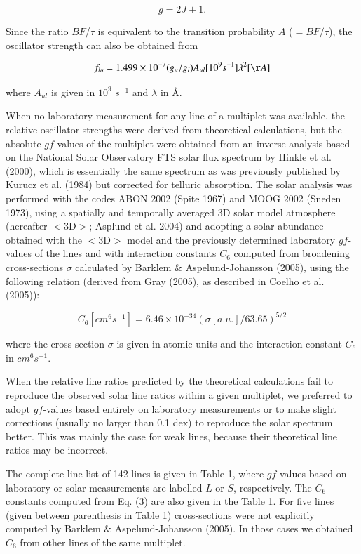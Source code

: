 \documentclass[traditabstract]{aa} %
\begin{document}
$$g = 2 J + 1.$$

\noindent Since the ratio $BF$/$\tau$ is equivalent to the transition probability $A$
($= BF/\tau$), the oscillator strength can also be obtained from

\begin{equation}
f_{lu} = 1.499 \times 10^{-7} (g_u/g_l) A_{ul}[10^9 s^{-1}] \lambda^2[\AA]
\end{equation}

\noindent where $A_{ul}$ is given in $10^9$ $s^{-1}$ and $\lambda$ in \AA.


When no laboratory measurement for any line of a multiplet was available,
the relative oscillator strengths were derived from theoretical
calculations, but the absolute $gf$-values of the multiplet were obtained 
from an inverse analysis based on the 
National Solar Observatory FTS solar flux spectrum by 
Hinkle et al. (2000), which is essentially the same spectrum as was previously 
published by Kurucz et al. (1984) but corrected for telluric absorption. 
The solar analysis was performed with the codes ABON 2002 (Spite 1967) and MOOG 2002 (Sneden 1973), 
using a spatially and temporally averaged 3D solar model atmosphere (hereafter
$<$3D$>$; Asplund et al. 2004) and
adopting a solar abundance obtained with the $<$3D$>$ model 
and the previously determined laboratory $gf$-values of the  lines
and with interaction constants $C_6$ computed from broadening cross-sections $\sigma$
calculated by Barklem \& Aspelund-Johansson (2005), using the following relation
(derived from Gray (2005), as described in Coelho et al. (2005)):

\begin{equation}
C_6[cm^6 s^{-1}] = 6.46 \times 10^{-34} (\sigma[a.u.]/63.65)^{5/2}
\end{equation}

\noindent where the cross-section $\sigma$ is given in atomic units and
the interaction constant $C_6$ in $cm^6 s^{-1}$.

When the relative line ratios predicted by the 
theoretical calculations fail to reproduce the observed solar line ratios
within a given multiplet, we preferred to adopt $gf$-values based entirely
on laboratory measurements or to make slight corrections (usually no larger than 0.1 dex) 
to reproduce the solar spectrum better. This was mainly the
case for weak lines, because their theoretical line ratios may be incorrect.

The complete line list of 142  lines is given in Table 1,
where $gf$-values based on laboratory or solar measurements 
are labelled $L$ or $S$, respectively. The $C_6$ constants computed from
Eq. (3) are also given in the Table 1. For five lines (given
between parenthesis in Table 1) cross-sections
were not explicitly computed by Barklem \& Aspelund-Johansson (2005).
In those cases we obtained $C_6$ from other lines of the same
multiplet.
\end{document}
